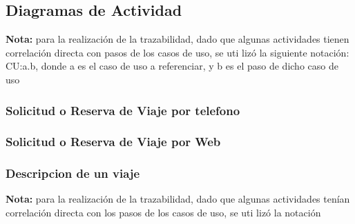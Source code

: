 \subsection{Diagramas de Actividad}

\textbf{Nota:} para la realizaci\'on de la trazabilidad, dado que algunas actividades tienen correlaci\'on directa con pasos de los casos de uso, se uti
liz\'o la siguiente notaci\'on: CU:a.b, donde a es el caso de uso a referenciar, y b es el paso de dicho caso de uso


\subsubsection{Solicitud o Reserva de Viaje por telefono}
\subsubsection{Solicitud o Reserva de Viaje por Web}
\label{da:descripcionviaje}
\subsubsection{Descripcion de un viaje}

\textbf{Nota:} para la realizaci\'on de la trazabilidad, dado que algunas actividades ten\'ian correlaci\'on directa con los pasos de los casos de uso, se uti
liz\'o la notaci\'on
